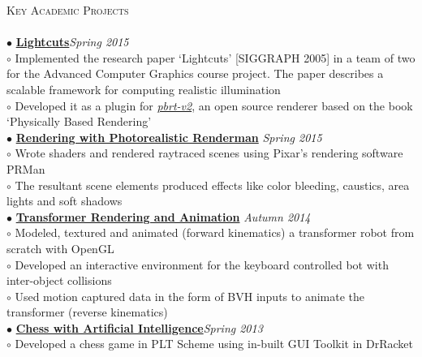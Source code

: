 \documentclass[a4paper,9pt]{article}
\begin{document}
\textcolor{myrust}{\large{\textsc{Key Academic Projects}}}\textcolor{mygray}{\sout{\hfill}}\\\\
\small %
\textbf{$\bullet$} \href{https://github.com/ranveeraggarwal/lightcuts}{\textbf{Lightcuts}}\hfill\textit{Spring 2015}\\
\hspace*{0.35cm}$\circ$ Implemented the research paper `Lightcuts' [SIGGRAPH 2005] in a team of two for the Advanced Computer Graphics course project. The paper describes a scalable framework for computing realistic illumination\\
\hspace*{0.35cm}$\circ$ Developed it as a plugin for \href{http://www.pbrt.org/}{\textsl{pbrt-v2}}, an open source renderer based on the book `Physically Based Rendering'\\
\textbf{$\bullet$} \href{https://github.com/ranveeraggarwal/renderman-transformer/}{\textbf{Rendering with Photorealistic Renderman}} \hfill \textit{Spring 2015}\\
\hspace*{0.35cm}$\circ$ Wrote shaders and rendered raytraced scenes using Pixar's rendering software PRMan\\
\hspace*{0.35cm}$\circ$ The resultant scene elements produced effects like color bleeding, caustics, area lights and soft shadows\\
\textbf{$\bullet$} \href{https://github.com/ranveeraggarwal/transformer}{\textbf{Transformer Rendering and Animation}} \hfill \textit{Autumn 2014}\\
\hspace*{0.35cm}$\circ$ Modeled, textured and animated (forward kinematics) a transformer robot from scratch with OpenGL\\
\hspace*{0.35cm}$\circ$ Developed an interactive environment for the keyboard controlled bot with inter-object collisions\\
\hspace*{0.35cm}$\circ$ Used motion captured data in the form of BVH inputs to animate the transformer (reverse kinematics)\\
\textbf{$\bullet$} \href{https://github.com/ranveeraggarwal/chess-titans}{\textbf{Chess with Artificial Intelligence}}\hfill \textit{Spring 2013}\\
\hspace*{0.35cm}$\circ$ Developed a chess game in PLT Scheme using in-built GUI Toolkit in DrRacket\\
\end{document}
